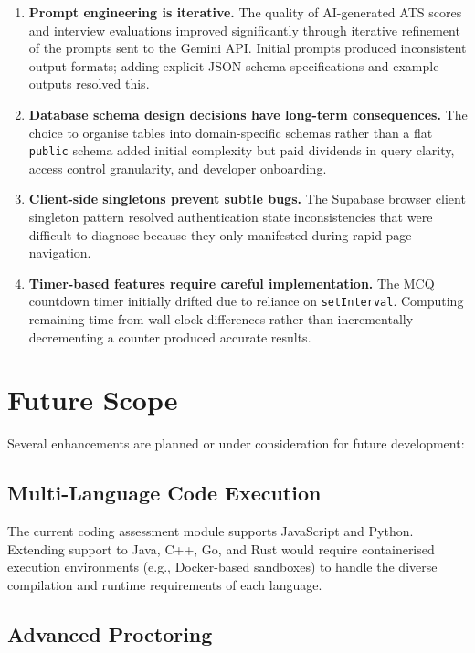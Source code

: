 \begin{enumerate}[leftmargin=1.5em]
  \item \textbf{Prompt engineering is iterative.} The quality of AI-generated ATS scores and interview evaluations improved significantly through iterative refinement of the prompts sent to the Gemini API. Initial prompts produced inconsistent output formats; adding explicit JSON schema specifications and example outputs resolved this.

  \item \textbf{Database schema design decisions have long-term consequences.} The choice to organise tables into domain-specific schemas rather than a flat \texttt{public} schema added initial complexity but paid dividends in query clarity, access control granularity, and developer onboarding.

  \item \textbf{Client-side singletons prevent subtle bugs.} The Supabase browser client singleton pattern resolved authentication state inconsistencies that were difficult to diagnose because they only manifested during rapid page navigation.

  \item \textbf{Timer-based features require careful implementation.} The MCQ countdown timer initially drifted due to reliance on \texttt{setInterval}. Computing remaining time from wall-clock differences rather than incrementally decrementing a counter produced accurate results.
\end{enumerate}

\section{Future Scope}
\label{sec:future}

Several enhancements are planned or under consideration for future development:

\subsection{Multi-Language Code Execution}

The current coding assessment module supports JavaScript and Python. Extending support to Java, C++, Go, and Rust would require containerised execution environments (e.g., Docker-based sandboxes) to handle the diverse compilation and runtime requirements of each language.

\subsection{Advanced Proctoring}

